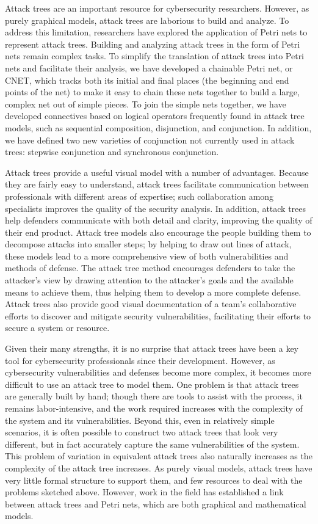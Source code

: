 \par  Attack trees are an important resource for cybersecurity researchers. However, as purely graphical models, attack trees are laborious to build and analyze. To address this limitation, researchers have explored the application of Petri nets to represent attack trees. Building and analyzing attack trees in the form of Petri nets remain complex tasks. To simplify the translation of attack trees into Petri nets and facilitate their analysis, we have developed a chainable Petri net, or CNET, which tracks both its initial and final places (the beginning and end points of the net) to make it easy to chain these nets together to build a large, complex net out of simple pieces. To join the simple nets together, we have developed connectives based on logical operators frequently found in attack tree models, such as sequential composition, disjunction, and conjunction. In addition, we have defined two new varieties of conjunction not currently used in attack trees: stepwise conjunction and synchronous conjunction. 
\par Attack trees provide a useful visual model with a number of advantages. Because they are fairly easy to understand, attack trees facilitate communication between professionals with different areas of expertise; such collaboration among specialists improves the quality of the security analysis. In addition, attack trees help defenders communicate with both detail and clarity, improving the quality of their end product. Attack tree models also encourage the people building them to decompose attacks into smaller steps; by helping to draw out lines of attack, these models lead to a more comprehensive view of both vulnerabilities and methods of defense. The attack tree method encourages defenders to take the attacker's view by drawing attention to the attacker's goals and the available means to achieve them, thus helping them to develop a more complete defense. Attack trees also provide good visual documentation of a team's collaborative efforts to discover and mitigate security vulnerabilities, facilitating their efforts to secure a system or resource. 
\par Given their many strengths, it is no surprise that attack trees have been a key tool for cybersecurity professionals since their development. However, as cybersecurity vulnerabilities and defenses become more complex, it becomes more difficult to use an attack tree to model them. One problem is that attack trees are generally built by hand; though there are tools to assist with the process, it remains labor-intensive, and the work required increases with the complexity of the system and its vulnerabilities. Beyond this, even in relatively simple scenarios, it is often possible to construct two attack trees that look very different, but in fact accurately capture the same vulnerabilities of the system. This problem of variation in equivalent attack trees also naturally increases as the complexity of the attack tree increases. As purely visual models, attack trees have very little formal structure to support them, and few resources to deal with the problems sketched above. However, work in the field has established a link between attack trees and Petri nets, which are both graphical and mathematical models.
